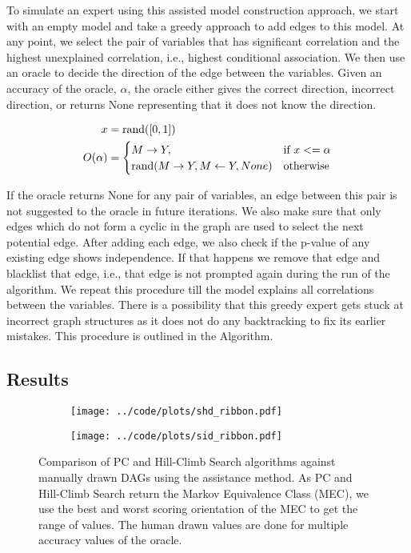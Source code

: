 \documentclass[letterpaper]{article} %
\begin{document}

To simulate an expert using this assisted model construction approach, we start
with an empty model and take a greedy approach to add edges to this model. At
any point, we select the pair of variables that has significant correlation and
the highest unexplained correlation, i.e., highest conditional association. We
then use an oracle to decide the direction of the edge between the variables.
Given an accuracy of the oracle, $ \alpha $, the oracle either gives the
correct direction, incorrect direction, or returns None representing that it
does not know the direction.

\begin{equation}
	\begin{split}
		x &= \textnormal{rand}([0, 1]) \\
		O(\alpha) &= \begin{cases} 
			M \rightarrow Y, & \textnormal{if  } x <= \alpha \\
			\textnormal{rand}(M \rightarrow Y, M \leftarrow Y, None) & \textnormal{otherwise} \\
				\end{cases} \\
	\end{split}
\end{equation}

If the oracle returns None for any pair of variables, an edge between this pair
is not suggested to the oracle in future iterations. We also make sure that
only edges which do not form a cyclic in the graph are used to select the next
potential edge. After adding each edge, we also check if the p-value of any
existing edge shows independence. If that happens we remove that edge and
blacklist that edge, i.e., that edge is not prompted again during the run of
the algorithm. We repeat this procedure till the model explains all
correlations between the variables. There is a possibility that this greedy
expert gets stuck at incorrect graph structures as it does not do any
backtracking to fix its earlier mistakes. This procedure is outlined in the
Algorithm.

\subsection{Results}
\begin{figure}
	\begin{subfigure}{0.5\textwidth}
		\centering
		\texttt{[image: ../code/plots/shd\_ribbon.pdf]}
		\caption{}
	\end{subfigure}
	\begin{subfigure}{0.5\textwidth}
		\centering
		\texttt{[image: ../code/plots/sid\_ribbon.pdf]}
		\caption{}
	\end{subfigure}
	\caption{Comparison of PC and Hill-Climb Search algorithms against
		manually drawn DAGs using the assistance method. As PC and
		Hill-Climb Search return the Markov Equivalence Class (MEC), we
		use the best and worst scoring orientation of the MEC to get
		the range of values. The human drawn values are done for
		multiple accuracy values of the oracle.}
\end{figure}
\end{document}
